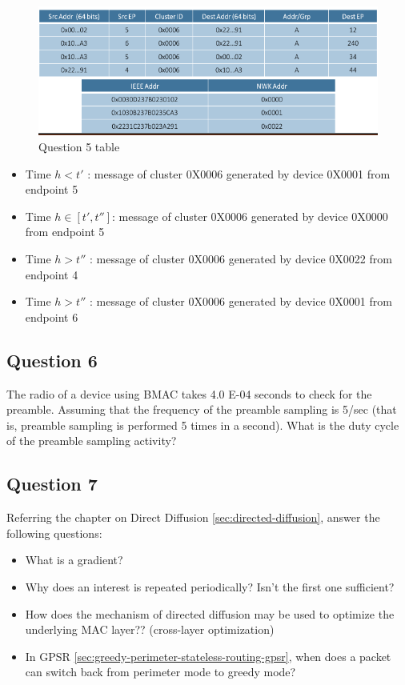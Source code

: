 \begin{figure}[h]
	\centering\includegraphics[scale=0.50]{images/Pasted image 20230601094724.png}
	\caption{Question 5 table}
	\label{q5-schema}
\end{figure}


\begin{itemize}
	\item Time $h<t'$ : message of cluster 0X0006 generated by device 0X0001 from endpoint 5
	\item 
	Time $h \in [t', t'']$: message of cluster 0X0006 generated by device 0X0000 from endpoint 5
	\item
	Time $h>t''$ : message of cluster 0X0006 generated by device 0X0022 from endpoint 4
	\item
	Time $h>t''$ : message of cluster 0X0006 generated by device 0X0001 from endpoint 6
\end{itemize}

\subsection{Question 6}
The radio of a device using BMAC takes 4.0 E-04 seconds to check for the preamble. Assuming that the frequency of the preamble sampling is 5/sec (that is, preamble sampling is performed 5 times in a second). What is the duty cycle of the preamble sampling activity?

\subsection{Question 7}
Referring the chapter on Direct Diffusion \ref{sec:directed-diffusion}, answer the following questions:
\begin{itemize}
	\item What is a gradient?
	\item Why does an interest is repeated  periodically? Isn’t the first one sufficient?
	\item How does the mechanism of directed diffusion may be used to
	optimize the underlying MAC layer?? (cross-layer optimization)
	\item In GPSR \ref{sec:greedy-perimeter-stateless-routing-gpsr}, when does a packet can switch back from
	perimeter mode to greedy mode?
\end{itemize}



